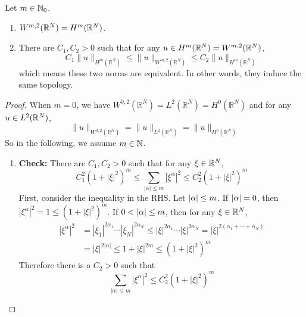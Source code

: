 \begin{thm}
	Let $m \in \mathbb{N}_0$.
	\begin{enumerate}[label=(\arabic{*})]
		\item $W^{m,2}(\mathbb{R}^N) = H^m(\mathbb{R}^N)$.
		\item There are $C_1,C_2 > 0$ such that for any $u \in H^m(\mathbb{R}^N) = W^{m,2}(\mathbb{R}^N)$,
		\begin{equation*}
			C_1\|u\|_{H^m\left(\mathbb{R}^N\right)} \leq\|u\|_{W^{m, 2}\left(\mathbb{R}^N\right)} \leq C_2\|u\|_{H^m\left(\mathbb{R}^N\right)}
		\end{equation*}
		which means these two norms are equivalent. In other words, they induce the same topology.
	\end{enumerate}
\end{thm}
\begin{proof}
	When $m = 0$, we have $W^{0,2}\left(\mathbb{R}^N\right)=L^2\left(\mathbb{R}^N\right)=H^0\left(\mathbb{R}^N\right)$ and for any $u \in L^2(\mathbb{R}^N)$,
	\begin{equation*}
		\|u\|_{W^{0,2}\left(\mathbb{R}^N\right)}=\|u\|_{L^2\left(\mathbb{R}^N\right)}=\|u\|_{H^0\left(\mathbb{R}^N\right)}
	\end{equation*}
	So in the following, we assume $m \in \mathbb{N}$.
	\begin{enumerate}[label=(\Roman{*})]
		\item \textbf{Check:} There are $C_1,C_2 > 0$ such that for any $\xi \in \mathbb{R}^N$,
		\begin{equation*}
			C_1^2\left(1+|\xi|^2\right)^m \leq \sum_{|\alpha| \leq m}\left|\xi^\alpha\right|^2 \leq C_2^2\left(1+|\xi|^2\right)^m
		\end{equation*}
		First, consider the inequality in the RHS. Let $\left\lvert\alpha\right\lvert \leq m$. If $\left\lvert\alpha\right\lvert = 0$, then $\left|\xi^\alpha\right|^2=1 \leq\left(1+|\xi|^2\right)^m$. If $0 < \left\lvert\alpha\right\lvert \leq m$, then for any $\xi \in \mathbb{R}^N$,
		\begin{equation*}
			\begin{aligned}
				\left|\xi^\alpha\right|^2 & =\left|\xi_1\right|^{2 \alpha_1} \cdots\left|\xi_N\right|^{2 \alpha_N} \leq|\xi|^{2 \alpha_1} \cdots|\xi|^{2 \alpha_N}=|\xi|^{2\left(\alpha_1+\cdots+\alpha_N\right)} \\
				& =|\xi|^{2|\alpha|} \leq 1+|\xi|^{2 m} \leq\left(1+|\xi|^2\right)^m
			\end{aligned}
		\end{equation*}
		Therefore there is a $C_2 > 0$ such that
		\begin{equation*}
			\sum_{|\alpha| \leq m}\left|\xi^\alpha\right|^2 \leq C_2^2\left(1+|\xi|^2\right)^m

\end{equation*}
\end{enumerate}
\end{proof}
